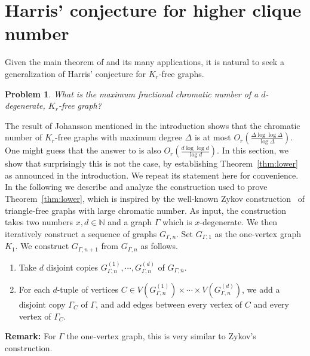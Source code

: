 \documentclass[10pt]{amsart}
\newtheorem{problem}[theorem]{Problem}
\theoremstyle{definition}
\begin{document}
\section{Harris' conjecture for higher clique number}
Given the main theorem of \cite{martinsson} and its many applications, it is natural to seek a generalization of Harris' conjecture for $K_r$-free graphs.
\begin{problem}
    \label{problem:harris-kr}
    What is the maximum fractional chromatic number of a $d$-degenerate, $K_r$-free graph?
\end{problem}
The result of Johansson mentioned in the introduction shows that the chromatic number of $K_r$-free graphs with maximum degree $\Delta$ is at most $O_r\left(\frac{\Delta \log\log \Delta}{\log \Delta}\right)$. One might guess  that the answer to  is also $O_r\left(\frac{d \log\log d}{\log d}\right)$. In this section, we show that surprisingly this is not the case, by establishing Theorem~\ref{thm:lower} as announced in the introduction. We repeat its statement here for convenience.
\thmlowerrestate*
In the following we describe and analyze the construction used to prove Theorem~\ref{thm:lower}, which is inspired by the well-known Zykov construction~\cite{zykov} of triangle-free graphs with large chromatic number. As input, the construction takes two numbers $x,d\in\mathbb{N}$ and a graph $\Gamma$ which is $x$-degenerate.
 We then iteratively construct a sequence of graphs $G_{\Gamma, n}$. Set $G_{\Gamma, 1}$ as the one-vertex graph $K_1$. We construct $G_{\Gamma, n + 1}$ from $G_{\Gamma, n}$ as follows.
\begin{enumerate}
    \item Take $d$ disjoint copies $G_{\Gamma, n}^{(1)}, \cdots, G_{\Gamma, n}^{(d)}$ of $G_{\Gamma, n}$.
    \item For each $d$-tuple of vertices $C \in V(G_{\Gamma, n}^{(1)}) \times \cdots \times V(G_{\Gamma, n}^{(d)})$, we add a disjoint copy $\Gamma_C$ of $\Gamma$, and add edges between every vertex of $C$ and every vertex of $\Gamma_C$.
\end{enumerate}
\textbf{Remark: }For $\Gamma$ the one-vertex graph, this is very similar to Zykov's construction.
\end{document}
